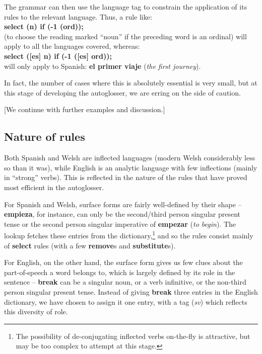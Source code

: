 \documentclass[11pt]{article}
\begin{document}
The grammar can then use the language tag to constrain the application of its rules to the relevant language.  Thus, a rule like:\\
\indent\textbf{select (n) if (-1 (ord));}\\
(to choose the reading marked ``noun'' if the preceding word is an ordinal) will apply to all the languages covered, whereas:\\
\indent\textbf{select ([es] n) if (-1 ([es] ord));}\\
will only apply to Spanish: \textbf{el primer viaje} (\textit{the first journey}).

In fact, the number of cases where this is absolutely essential is very small, but at this stage of developing the autoglosser, we are erring on the side of caution.

[We continue with further examples and discussion.]

\subsection{Nature of rules}
\label{sec:nature}

Both Spanish and Welsh are inflected languages (modern Welsh considerably less so than it was), while English is an analytic language with few inflections (mainly in ``strong'' verbs).  This is reflected in the nature of the rules that have proved most efficient in the autoglosser.  

For Spanish and Welsh, surface forms are fairly well-defined by their shape -- \textbf{empieza}, for instance, can only be the second/third person singular present tense or the second person singular imperative of \textbf{empezar} (\textit{to begin}).  The lookup fetches these entries from the dictionary,\footnote{The possibility of de-conjugating inflected verbs on-the-fly is attractive, but may be too complex to attempt at this stage.} and so the rules consist mainly of \textbf{select} rules (with a few \textbf{remove}s and \textbf{substitute}s).  

For English, on the other hand, the surface form gives us few clues about the part-of-speech a word belongs to, which is largely defined by its role in the sentence -- \textbf{break} can be a singular noun, or a verb infinitive, or the non-third person singular present tense.  Instead of giving \textbf{break} three entries in the English dictionary, we have chosen to assign it one entry, with a tag (\textit{sv}) which reflects this diversity of role.  
\end{document}
